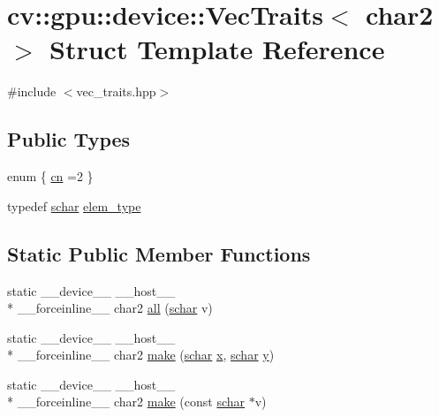 \hypertarget{structcv_1_1gpu_1_1device_1_1VecTraits_3_01char2_01_4}{\section{cv\-:\-:gpu\-:\-:device\-:\-:Vec\-Traits$<$ char2 $>$ Struct Template Reference}
\label{structcv_1_1gpu_1_1device_1_1VecTraits_3_01char2_01_4}
}


{\ttfamily \#include $<$vec\-\_\-traits.\-hpp$>$}

\subsection*{Public Types}
\begin{DoxyCompactItemize}
\item 
enum \{ \hyperlink{structcv_1_1gpu_1_1device_1_1VecTraits_3_01char2_01_4_af7a9402d7973c8116134ac1b0b3ded47a88b37ac9bf3a53ac20c316d29489a411}{cn} =2
 \}
\item 
typedef \hyperlink{core_2types__c_8h_a0fd9ce9d735064461bebfe6037026093}{schar} \hyperlink{structcv_1_1gpu_1_1device_1_1VecTraits_3_01char2_01_4_ae5f29450f72693318aa5329c10d2b053}{elem\-\_\-type}
\end{DoxyCompactItemize}
\subsection*{Static Public Member Functions}
\begin{DoxyCompactItemize}
\item 
static \-\_\-\-\_\-device\-\_\-\-\_\- \-\_\-\-\_\-host\-\_\-\-\_\- \\*
\-\_\-\-\_\-forceinline\-\_\-\-\_\- char2 \hyperlink{structcv_1_1gpu_1_1device_1_1VecTraits_3_01char2_01_4_a9b0b403f9742bb492a94780885643873}{all} (\hyperlink{core_2types__c_8h_a0fd9ce9d735064461bebfe6037026093}{schar} v)
\item 
static \-\_\-\-\_\-device\-\_\-\-\_\- \-\_\-\-\_\-host\-\_\-\-\_\- \\*
\-\_\-\-\_\-forceinline\-\_\-\-\_\- char2 \hyperlink{structcv_1_1gpu_1_1device_1_1VecTraits_3_01char2_01_4_aac597891f2a81198b77ca1e5211f2b49}{make} (\hyperlink{core_2types__c_8h_a0fd9ce9d735064461bebfe6037026093}{schar} \hyperlink{highgui__c_8h_a6150e0515f7202e2fb518f7206ed97dc}{x}, \hyperlink{core_2types__c_8h_a0fd9ce9d735064461bebfe6037026093}{schar} \hyperlink{highgui__c_8h_af1202c02b14870c18fb3a1da73e9e7c7}{y})
\item 
static \-\_\-\-\_\-device\-\_\-\-\_\- \-\_\-\-\_\-host\-\_\-\-\_\- \\*
\-\_\-\-\_\-forceinline\-\_\-\-\_\- char2 \hyperlink{structcv_1_1gpu_1_1device_1_1VecTraits_3_01char2_01_4_a86c5e517e379bcebcc4dc82b97994c55}{make} (const \hyperlink{core_2types__c_8h_a0fd9ce9d735064461bebfe6037026093}{schar} $\ast$v)
\end{DoxyCompactItemize}


